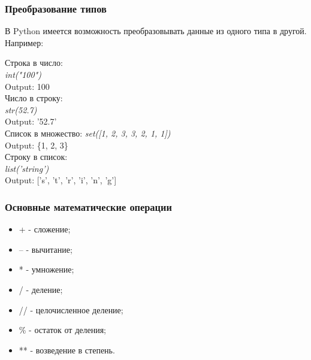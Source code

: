 \subsubsection*{Преобразование типов}

В Python имеется возможность преобразовывать данные из одного типа в другой. Например:

\begin{flushleft}
	Строка в число: \\
	\colorbox[rgb]{0.95, 0.95, 0.95}{\textit{int("100")}} \\
	\colorbox[rgb]{0.95, 0.95, 0.95}{Output: 100} \\
	\vspace{1cm}
	Число в строку: \\
	\colorbox[rgb]{0.95, 0.95, 0.95}{\textit{str(52.7)}} \\
	\colorbox[rgb]{0.95, 0.95, 0.95}{Output: '52.7'} \\
	\vspace{1cm}
	Список в множество:
	\colorbox[rgb]{0.95, 0.95, 0.95}{\textit{set([1, 2, 3, 3, 2, 1, 1])}} \\
	\colorbox[rgb]{0.95, 0.95, 0.95}{Output: \{1, 2, 3\}} \\
	\vspace{1cm}
	Строку в список: \\
	\colorbox[rgb]{0.95, 0.95, 0.95}{\textit{list('string')}} \\
	\colorbox[rgb]{0.95, 0.95, 0.95}{Output: ['s', 't', 'r', 'i', 'n', 'g']} \\
\end{flushleft}

\subsubsection*{Основные математические операции}
\begin{itemize}
	\setlength\itemsep{0.01cm}
	\item[] + - сложение;
	\item[] -- - вычитание;
	\item[] * - умножение;
	\item[] / - деление;
	\item[] // - целочисленное деление;
	\item[] \% - остаток от деления;
	\item[] ** - возведение в степень.
\end{itemize}

